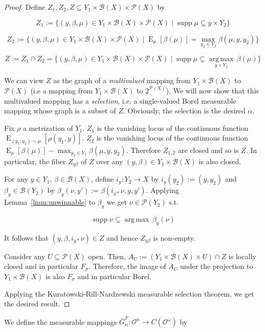 \documentclass[11pt]{article}
\theoremstyle{definition}
\theoremstyle{plain}
\newcommand{\Argmax}[1]{\underset{#1}{\operatorname{arg\,max}}\,}
\DeclareMathOperator{\E}{E}
\newcommand{\PM}{\mathcal{P}}
\DeclareMathOperator{\Sp}{supp}
\newcommand{\Ob}{\mathcal{O}}
\newcommand{\OO}{\Ob^\omega}
\newcommand{\Gm}{\mathcal{B}}
\newcommand{\CO}{C(\OO)}
\begin{document}
\begin{proof}

Define ${Z_1, Z_2, Z \subseteq Y_1 \times \Gm(X) \times \PM(X)}$ by

$${Z_1:=\{(y,\beta,\mu) \in Y_1 \times \Gm(X) \times \PM(X) \mid \Sp \mu \subseteq y \times Y_2\}}$$

$${Z_2:=\{(y,\beta,\mu) \in Y_1 \times \Gm(X) \times \PM(X) \mid \E_\mu[\beta(\mu)] = \max_{y_2 \in Y_2} \beta(\mu,y,y_2)\}}$$

$${Z:=Z_1 \cap Z_2 =\{(y,\beta,\mu) \in Y_1 \times \Gm(X) \times \PM(X) \mid \Sp \mu \subseteq \Argmax{y \times Y_2} \beta(\mu)\}}$$

We can view ${Z}$ as the graph of a \emph{multivalued} mapping from ${Y_1 \times \Gm(X)}$ to ${\PM(X)}$ (i.e a mapping from ${Y_1 \times \Gm(X)}$ to $2^{\PM(X)}$). We will now show that this multivalued mapping has a \emph{selection}, i.e. a single-valued Borel measurable mapping whose graph is a subset of $Z$. Obviously, the selection is the desired ${\alpha}$.

Fix $\rho$ a metrization of $Y_1$. $Z_1$ is the vanishing locus of the continuous function $\E_{(y_1, y_2) \sim \mu}[\rho(y_1,y)]$. $Z_2$ is the vanishing locus of the continuous function $\E_\mu[\beta(\mu)] - \max_{y_2 \in Y_2} \beta(\mu,y,y_2)$. Therefore $Z_{1,2}$ are closed and so is $Z$. In particular, the fiber ${Z_{y\beta}}$ of ${Z}$ over any ${(y,\beta) \in Y_1 \times \Gm(X)}$ is also closed. 

For any ${y \in Y_1}$, ${\beta \in \Gm(X)}$, define ${i_y: Y_2 \rightarrow X}$ by ${i_y(y_2):=(y,y_2)}$ and ${\beta_y \in \Gm(Y_{2})}$ by $\beta_y(\nu,y'):=\beta(i_{y*}\nu,y,y')$. Applying Lemma~\ref{lmm:unwinnable} to ${\beta_y}$ we get ${\nu \in \PM(Y_2)}$ s.t.

$$\Sp \nu \subseteq \Argmax{} \beta_y(\nu)$$

It follows that ${(y,\beta,i_{y*}\nu) \in Z}$ and hence ${Z_{y\beta}}$ is non-empty.

Consider any ${U \subseteq \PM(X)}$ open. Then, ${A_U:=(Y_{1} \times \Gm(X) \times U) \cap Z}$ is locally closed and in particular ${F_\sigma}$. Therefore, the image of ${A_U}$ under the projection to ${Y_{1} \times \Gm(X)}$ is also ${F_\sigma}$ and in particular Borel. 

Applying the Kuratowski-Rill-Nardzewski measurable selection theorem, we get the desired result.
\end{proof}

We define the measurable mappings $\bar{G}^F_n: \Ob^n \rightarrow \CO$ by
\end{document}
